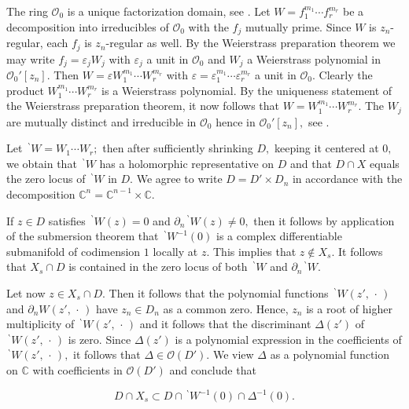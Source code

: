 \documentclass[12pt,a4paper]{article}
\def\msy#1{{\mathbb #1}}
\def\C{{\msy C}}
\def\ge{\varepsilon}
\def\gD{\Delta}
\def\cO{{\mathcal O}}
\numberwithin{Thm}{section}
\numberwithin{equation}{section}
\def\dotvar{\, \cdot\,}
\numberwithin{equation}{section}
\def\bp{\!{\,}^\backprime}
\begin{document}
The ring $\cO_0$ is a unique factorization domain, see \cite[Thm.~III.3.3]{FGhol}.
Let $W=  f_1^{m_1} \cdots f_r^{m_r}$ be a decomposition into 
irreducibles of $\cO_0$ with the $f_j$ mutually prime. 
Since $W$ is $z_n$-regular, each $f_j$ is $z_n$-regular as well. By the Weierstrass
preparation theorem we may write $f_j = \ge_j W_j$ with $\ge_j$ a unit in $\cO_0$ 
and $W_j$ a Weierstrass polynomial in $\cO_0'[z_n].$ 
Then $W = \ge W_1^{m_1}\cdots W_r^{m_r} $ 
with $\ge = \ge_1^{m_1}\cdots \ge_r^{m_r}$ a unit in $\cO_0$. Clearly the product
$ W_1^{m_1}\cdots W_r^{m_r} $ is a Weierstrass polynomial. By the uniqueness
statement of the Weierstrass preparation theorem, it now follows that
$W = W_1^{m_1} \cdots W_r^{m_r}.$ The $W_j$ are mutually distinct and irreducible 
in $\cO_0$ hence in $\cO_0'[z_n],$ see \cite[Lemma II.5]{GRcomp}.

Let $\bp W = W_1 \cdots W_r;$ then after sufficiently shrinking
$D,$ keeping it centered at $0,$ we obtain that $\bp W$ has a holomorphic representative on $D$ and that $D \cap X$ equals the zero locus of $\bp W$ in $D.$ 
We agree to write $D = D' \times D_n$ in accordance with the decomposition
$\C^n = \C^{n-1} \times \C.$ 

If $z \in D$ satisfies $\bp W(z) = 0 $ and $\partial_n \bp W (z) \neq 0,$ then it follows by application
of the submersion theorem that  $\bp W^{-1}(0)$ is a complex differentiable submanifold of 
codimension $1$ locally at $z.$ This implies that $z \notin X_s.$ It follows that  $X_s \cap D$ is contained in the zero locus of both $\bp W$ and $\partial_n \bp W.$ 

Let now $z \in X_s\cap D.$ Then it follows that the polynomial functions $\bp W(z', \dotvar)$ and $\partial_n W(z', \dotvar)$ have $z_n\in D_n$ as a common zero. Hence, $z_n$ 
is a root of higher multiplicity of $\bp W(z', \dotvar)$ and it follows that 
the discriminant $\gD(z')$ of $\bp W(z', \dotvar)$ is zero. Since $\gD(z')$ is 
a polynomial expression in the coefficients of $\bp W(z', \dotvar),$ it follows that 
$\gD \in \cO(D').$ We view $\gD$ as a polynomial function on $\C$ 
with coefficients in $\cO(D')$ and conclude that 

\begin{equation}
\label{e: X as zero set of W gD}
D \cap X_s \subset D \cap \bp  W^{-1}(0)  \cap \gD^{-1}(0).
\end{equation}
\end{document}
